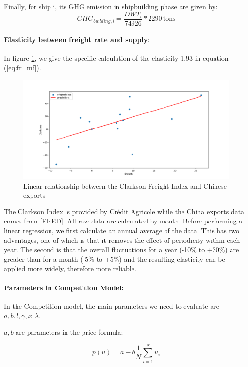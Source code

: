 \documentclass[a4paper,12pt]{article}
\begin{document}
Finally, for ship i, its GHG emission in shipbuilding phase are given by:
\begin{equation}
	GHG_{building,i} = \dfrac{DWT_i}{74926} * 2290 \, \text{tons}
	\label{eq:shipbuilding}
\end{equation}

\paragraph{Elasticity between freight rate and supply:}
In figure \ref{fig:elasticity}, we give the specific calculation of the elasticity 1.93 in equation (\ref{eq:fr_mf}).\\

\begin{figure}[htbp]
	\centering
	\includegraphics[width=0.5\linewidth]{report-fig/Elasticity.png}
	\caption{Linear relationship between the Clarkson Freight Index and Chinese exports}
	\label{fig:elasticity}
\end{figure}

The Clarkson Index is provided by Crédit Agricole while the China exports data comes from \href{https://fred.stlouisfed.org/series/XTEXVA01CNM667S}{[FRED]}.
All raw data are calculated by month.
Before performing a linear regression, we first calculate an annual average of the data.
This has two advantages, one of which is that it removes the effect of periodicity within each year.
The second is that the overall fluctuations for a year (-10\% to +30\%) are greater than for a month (-5\% to +5\%) and the resulting elasticity can be applied more widely, therefore more reliable.

\paragraph{Parameters in Competition Model:} In the Competition model, the main parameters we need to evaluate are $a, b, l, \gamma, x, \lambda$.

$a,b$ are parameters in the price formula:

\begin{equation*}
	p(u) = a - b \frac{1}{N}\sum_{i=1}^N u_i
\end{equation*}
\end{document}
